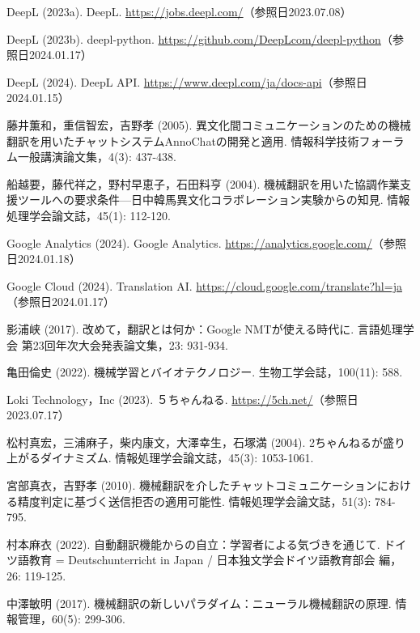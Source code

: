 \documentclass[b5paper,12pt,dvipdfmx]{jsreport}
\begin{document}
\begin{thebibliography}{99}

DeepL (2023a). DeepL. \url{https://jobs.deepl.com/}（参照日2023.07.08）

DeepL (2023b). deepl-python. \url{https://github.com/DeepLcom/deepl-python}（参照日2024.01.17）

DeepL (2024). DeepL API. \url{https://www.deepl.com/ja/docs-api}（参照日2024.01.15）

藤井薫和，重信智宏，吉野孝 (2005). 異文化間コミュニケーションのための機械翻訳を用いたチャットシステムAnnoChatの開発と適用. 情報科学技術フォーラム一般講演論文集，4(3): 437-438.

船越要，藤代祥之，野村早恵子，石田料亨 (2004). 機械翻訳を用いた協調作業支援ツールへの要求条件—日中韓馬異文化コラボレーション実験からの知見. 情報処理学会論文誌，45(1): 112-120.

Google Analytics (2024). Google Analytics. \url{https://analytics.google.com/}（参照日2024.01.18）

Google Cloud (2024). Translation AI. \url{https://cloud.google.com/translate?hl=ja}（参照日2024.01.17）

影浦峡 (2017). 改めて，翻訳とは何か：Google NMTが使える時代に. 言語処理学会 第23回年次大会発表論文集，23: 931-934.

亀田倫史 (2022). 機械学習とバイオテクノロジー. 生物工学会誌，100(11): 588.

Loki Technology，Inc (2023). ５ちゃんねる. \url{https://5ch.net/}（参照日2023.07.17）

松村真宏，三浦麻子，柴内康文，大澤幸生，石塚満 (2004). 2ちゃんねるが盛り上がるダイナミズム. 情報処理学会論文誌，45(3): 1053-1061.

宮部真衣，吉野孝 (2010). 機械翻訳を介したチャットコミュニケーションにおける精度判定に基づく送信拒否の適用可能性. 情報処理学会論文誌，51(3): 784-795.

村本麻衣 (2022). 自動翻訳機能からの自立：学習者による気づきを通じて. ドイツ語教育 = Deutschunterricht in Japan / 日本独文学会ドイツ語教育部会 編，26: 119-125.

中澤敏明 (2017). 機械翻訳の新しいパラダイム：ニューラル機械翻訳の原理. 情報管理，60(5): 299-306.


\end{thebibliography}
\end{document}
